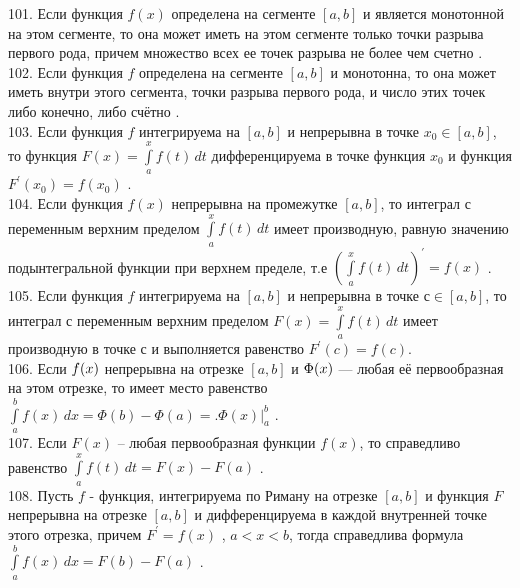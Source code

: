 \documentclass[12pt]{article}
\begin{document}
101. Если функция ${\displaystyle f(x)}$ определена на сегменте ${\displaystyle [a,b]}$ и является монотонной на этом сегменте, то она может иметь на этом сегменте только точки разрыва первого рода, причем множество всех ее точек разрыва не более чем счетно .\\

102. Если функция ${\displaystyle f}$  определена на сегменте  ${\displaystyle \left [ a,b \right ]}$ и монотонна, то она может иметь внутри этого сегмента, точки разрыва первого рода, и число этих точек либо конечно, либо счётно .\\

103. Если функция ${\displaystyle f}$ интегрируема на ${\displaystyle [a,b]}$ и непрерывна в точке ${\displaystyle x_0 \in [a,b]}$, то функция ${\displaystyle F(x)=\int \limits _{a}^{x} f(t)\,dt}$  дифференцируема в точке функция ${\displaystyle x_0}$ и функция ${\displaystyle F^{\prime}(x_0)=f(x_0)}$ .\\

104. Если функция ${\displaystyle f(x)}$ непрерывна на промежутке ${\displaystyle [a,b]}$, то интеграл с переменным верхним пределом  ${\displaystyle \int \limits _{a}^{x} f(t)\,dt}$ имеет производную, равную значению подынтегральной функции при верхнем пределе, т.е ${\displaystyle \left (\int \limits _{a}^{x} f(t)\,dt\right )^{\prime}=f(x)}$ .\\

105. Если функция ${\displaystyle f}$ интегрируема на ${\displaystyle [a,b]}$ и непрерывна в точке ${\displaystyle с \in [a,b]}$, то интеграл с переменным верхним пределом ${\displaystyle F(x)=\int \limits _{a}^{x} f(t)\,dt}$ имеет производную в точке ${\displaystyle с}$ и выполняется равенство ${\displaystyle F^{\prime}(c)=f(c)}$.\\

106. Если ${\displaystyle \textstyle f(x)}$ непрерывна на отрезке ${\displaystyle \left [a,b\right ]}$  и ${\displaystyle \textstyle \Phi (x)}$ — любая её первообразная на этом отрезке, то имеет место равенство ${\displaystyle \int \limits _a^b f(x)\,dx=\Phi (b)-\Phi (a)={\Bigg .}\Phi (x){\Bigg |}_{a}^{b}}$ .\\

107. Если  ${\displaystyle F (x)}$ – любая первообразная функции ${\displaystyle f(x)}$,  то справедливо равенство ${\displaystyle \int \limits _a^x f(t)\,dt=F(x)-F(a)}$ .\\

108. Пусть ${\displaystyle f}$ - функция, интегрируема по Риману на отрезке ${\displaystyle [a,b]}$ и функция ${\displaystyle F}$ непрерывна на отрезке ${\displaystyle [a,b]}$ и дифференцируема в каждой внутренней точке этого отрезка, причем ${\displaystyle F^{\prime}=f(x)}$ , ${\displaystyle a<x<b}$, тогда справедлива формула ${\displaystyle \int \limits _{a}^{b} f(x)\,dx=F(b)-F(a)}$ .\\
\end{document}
